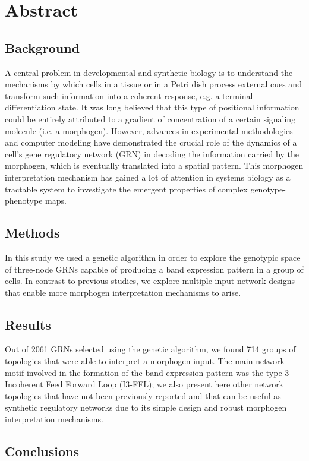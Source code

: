 \documentclass[10pt,letterpaper]{article}
\begin{document}
\section*{Abstract}

\subsection*{Background}
A central problem in developmental and synthetic biology is to understand the 
mechanisms by which cells in a tissue or in a Petri dish process external cues 
and transform such information into a coherent response, e.g. a terminal 
differentiation state. It was long believed that this type of positional 
information could be entirely attributed to a gradient of concentration of a 
certain signaling molecule (i.e. a morphogen). However, advances in experimental 
methodologies and computer modeling have demonstrated the crucial role of the 
dynamics of a cell's gene regulatory network (GRN) in decoding the information 
carried by the morphogen, which is eventually translated into a spatial 
pattern. This morphogen interpretation mechanism has gained a lot of attention 
in systems biology as a tractable system to investigate the emergent properties 
of complex genotype-phenotype maps.

\subsection*{Methods}
In this study we used a genetic algorithm in order to explore the genotypic 
space of three-node GRNs capable of producing a band expression pattern in a 
group of cells. In contrast to previous studies, we explore multiple input 
network designs that enable more morphogen interpretation mechanisms to arise.

\subsection*{Results}
Out of 2061 GRNs selected using the genetic algorithm, we found 714 groups of 
topologies that were able to interpret a morphogen input. The main network motif 
involved in the formation of the band expression pattern was the type 3 
Incoherent Feed Forward Loop (I3-FFL); we also present here other network 
topologies that have not been previously reported and that can be useful as 
synthetic regulatory networks due to its simple design and robust morphogen 
interpretation mechanisms.

\subsection*{Conclusions}
\end{document}
